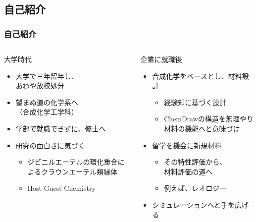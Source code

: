 \documentclass[12pt, dvipdfmx]{beamer}
\begin{document}
\subsection{自己紹介}
\begin{frame}
	\frametitle{自己紹介}
    \vspace{-3mm}
        \begin{columns}[T, onlytextwidth]
                \begin{block}{大学時代}
                    \begin{itemize}
                        \item 大学で三年留年し、\\あわや放校処分
                        \item 望まぬ道の化学系へ\\（合成化学工学科）
                        \item 学部で就職できずに、修士へ
                        \item 研究の面白さに気づく
                        \begin{itemize}
                            \item ジビニルエーテルの環化重合によるクラウンエーテル類縁体
                            \item Host-Guest Chemistry
                        \end{itemize}
                    \end{itemize}
                \end{block}
                \begin{exampleblock}{企業に就職後}
                    \begin{itemize}
                        \item 合成化学をベースとし、材料設計
                        \begin{itemize}
                            \item 経験知に基づく設計
                            \item ChemDrawの構造を無理やり材料の機能へと意味づけ
                        \end{itemize}
                        \item 留学を機会に新規材料
                        \begin{itemize}
                            \item その特性評価から、\\材料評価の道へ
                            \item 例えば、レオロジー
                        \end{itemize}
                        \item シミュレーションへと手を広げる
                    \end{itemize}
                \end{exampleblock}
        \end{columns}
\end{frame}
\end{document}
